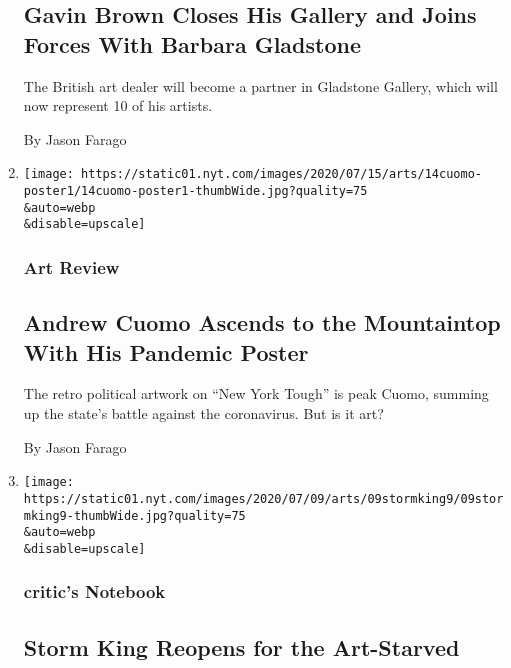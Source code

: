\begin{enumerate}
{  \subsection{Gavin Brown Closes His Gallery and Joins Forces With
  Barbara
  Gladstone}\label{gavin-brown-closes-his-gallery-and-joins-forces-with-barbara-gladstone}}

  The British art dealer will become a partner in Gladstone Gallery,
  which will now represent 10 of his artists.

  By Jason Farago
\item
  \href{/2020/07/14/arts/design/cuomo-covid-poster-new-york.html}{}

  \texttt{[image: https://static01.nyt.com/images/2020/07/15/arts/14cuomo-poster1/14cuomo-poster1-thumbWide.jpg?quality=75\\\&auto=webp\\\&disable=upscale]}

  \hypertarget{art-review}{%
  \subsubsection{Art Review}\label{art-review}}

  \hypertarget{andrew-cuomo-ascends-to-the-mountaintop-with-his-pandemic-poster}{%
  \subsection{Andrew Cuomo Ascends to the Mountaintop With His Pandemic
  Poster}\label{andrew-cuomo-ascends-to-the-mountaintop-with-his-pandemic-poster}}

  The retro political artwork on ``New York Tough'' is peak Cuomo,
  summing up the state's battle against the coronavirus. But is it art?

  By Jason Farago
\item
  \href{/2020/07/09/arts/design/storm-king-reopens.html}{}

  \texttt{[image: https://static01.nyt.com/images/2020/07/09/arts/09stormking9/09stormking9-thumbWide.jpg?quality=75\\\&auto=webp\\\&disable=upscale]}

  \hypertarget{critics-notebook-2}{%
  \subsubsection{critic's Notebook}\label{critics-notebook-2}}

  \hypertarget{storm-king-reopens-for-the-art-starved}{%
  \subsection{Storm King Reopens for the
  Art-Starved}\label{storm-king-reopens-for-the-art-starved}}


\end{enumerate}
